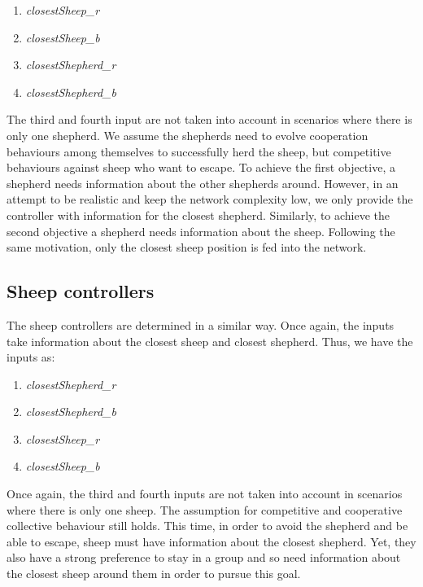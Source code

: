 \documentclass[conference]{IEEEtran}
\begin{document}
\begin{enumerate}
	\item \textit{closestSheep\_r}
	\item \textit{closestSheep\_b}
	\item \textit{closestShepherd\_r}
	\item \textit{closestShepherd\_b}
\end{enumerate}

The third and fourth input are not taken into account in scenarios where there is only one shepherd. 
We assume the shepherds need to evolve cooperation behaviours among themselves to successfully herd the sheep, but competitive behaviours against sheep who want to escape. To achieve the first objective, a shepherd needs information about the other shepherds around. However, in an attempt to be realistic and keep the network complexity low, we only provide the controller with information for the closest shepherd. Similarly, to achieve the second objective a shepherd needs information about the sheep. Following the same motivation, only the closest sheep position is fed into the network. 

\subsection{Sheep controllers}
The sheep controllers are determined in a similar way. Once again, the inputs take information about the closest sheep and closest shepherd. Thus, we have the inputs as:
 
\begin{enumerate}
	\item \textit{closestShepherd\_r}
	\item \textit{closestShepherd\_b}
	\item \textit{closestSheep\_r}
	\item \textit{closestSheep\_b}
\end{enumerate}

Once again, the third and fourth inputs are not taken into account in scenarios where there is only one sheep. 
The assumption for competitive and cooperative collective behaviour still holds. This time, in order to avoid the shepherd and be able to escape, sheep must have information about the closest shepherd. Yet, they also have a strong preference to stay in a group and so need information about the closest sheep around them in order to pursue this goal. 

\end{document}
